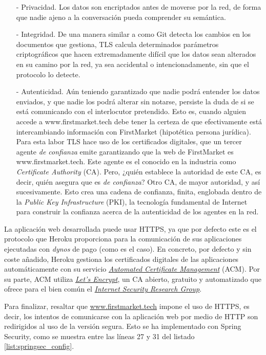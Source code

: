 \documentclass[a4paper]{article}
\begin{document}
		\begin{itemize}
			\item[-] Privacidad. Los datos son encriptados antes de moverse por la red, de forma que nadie ajeno a la conversación pueda comprender su semántica.
			\item[-] Integridad. De una manera similar a como Git detecta los cambios en los documentos que gestiona, TLS calcula determinados parámetros criptográficos que hacen extremadamente difícil que los datos sean alterados en su camino por la red, ya sea accidental o intencionadamente, sin que el protocolo lo detecte.
			\item[-] Autenticidad. Aún teniendo garantizado que nadie podrá entender los datos enviados, y que nadie los podrá alterar sin notarse, persiste la duda de si se está comunicando con el interlocutor pretendido. Esto es, cuando alguien accede a www.firstmarket.tech debe tener la certeza de que efectivamente está intercambiando información con FirstMarket (hipotética persona jurídica). Para esta labor TLS hace uso de los certificados digitales, que un tercer agente \emph{de confianza} emite garantizando que la web de FirstMarket es www.firstmarket.tech. Este agente es el conocido en la industria como \emph{Certificate Authority} (CA). Pero, ¿quién establece la autoridad de este CA, es decir, quién asegura que es \emph{de confianza}? Otro CA, de mayor autoridad, y así sucesivamente. Esto crea una cadena de confianza, finita, englobada dentro de la \emph{Public Key Infrastructure} (PKI), la tecnología fundamental de Internet para construir la confianza acerca de la autenticidad de los agentes en la red.
		\end{itemize}
	
	La aplicación web desarrollada puede usar HTTPS, ya que por defecto este es el protocolo que Heroku proporciona para la comunicación de sus aplicaciones ejecutadas con \emph{dynos} de pago (como es el caso). En concreto, por defecto y sin coste añadido, Heroku gestiona los certificados digitales de las aplicaciones automáticamente con su servicio \href{https://devcenter.heroku.com/articles/automated-certificate-management}{\emph{Automated Certificate Management}} (ACM). Por su parte, ACM utiliza \href{https://letsencrypt.org/}{\emph{Let’s Encrypt}}, un CA abierto, gratuito y automatizado que ofrece para el bien común el \href{https://www.abetterinternet.org/}{\emph{Internet Security Research Group}}.
	
	Para finalizar, resaltar que \href{https://firstmarket.tech}{www.firstmarket.tech} impone el uso de HTTPS, es decir, los intentos de comunicarse con la aplicación web por medio de HTTP son redirigidos al uso de la versión segura. Esto se ha implementado con Spring Security, como se muestra entre las líneas 27 y 31 del listado \ref{list:springsec_config}.
	
\end{document}
